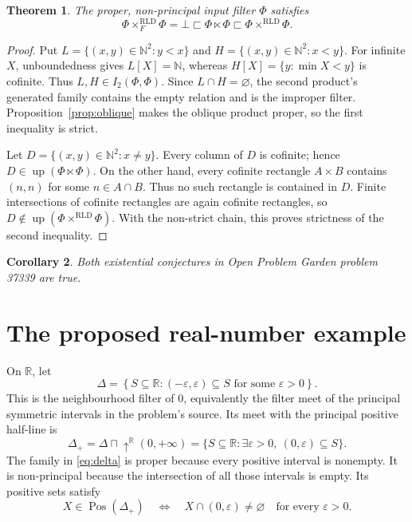 \documentclass[11pt,a4paper]{amsart}
\newtheorem{theorem}{Theorem}[section]
\newtheorem{corollary}[theorem]{Corollary}
\theoremstyle{definition}
\theoremstyle{remark}
\newcommand{\RLD}{\mathrm{RLD}}
\newcommand{\Up}{\operatorname{up}}
\newcommand{\Pos}{\operatorname{Pos}}
\newcommand{\N}{\mathbb{N}}
\newcommand{\R}{\mathbb{R}}
\begin{document}
\begin{theorem}\label{thm:nat}
The proper, non-principal input filter $\Phi$ satisfies
\[
 \Phi\times_F^{\RLD}\Phi=\bot
 \sqsubset\Phi\ltimes\Phi
 \sqsubset\Phi\times^{\RLD}\Phi.
\]
\end{theorem}
\begin{proof}
Put $L=\{(x,y)\in\N^2:y<x\}$ and $H=\{(x,y)\in\N^2:x<y\}$.
For infinite $X$, unboundedness gives $L[X]=\N$, whereas
$H[X]=\{y:\min X<y\}$ is cofinite. Thus $L,H\in I_2(\Phi,\Phi)$.
Since $L\cap H=\varnothing$, the second product's generated family contains
the empty relation and is the improper filter. Proposition~\ref{prop:oblique}
makes the oblique product proper, so the first inequality is strict.

Let $D=\{(x,y)\in\N^2:x\ne y\}$. Every column of $D$ is cofinite;
hence $D\in\Up(\Phi\ltimes\Phi)$. On the other hand, every cofinite
rectangle $A\times B$ contains $(n,n)$ for some $n\in A\cap B$.
Thus no such rectangle is contained in $D$. Finite intersections of cofinite
rectangles are again cofinite rectangles, so
$D\notin\Up(\Phi\times^{\RLD}\Phi)$. With the non-strict chain, this
proves strictness of the second inequality.
\end{proof}

\begin{corollary}
Both existential conjectures in Open Problem Garden problem 37339 are true.
\end{corollary}

\section{The proposed real-number example}

On $\R$, let
\[
 \Delta=\left\{S\subseteq\R:
       (-\varepsilon,\varepsilon)\subseteq S\text{ for some }\varepsilon>0
       \right\}.
\]
This is the neighbourhood filter of $0$, equivalently the filter meet of the
principal symmetric intervals in the problem's source. Its meet with the
principal positive half-line is
\begin{equation}\label{eq:delta}
 \Delta_+=\Delta\sqcap\uparrow^{\R}(0,+\infty)
 =\{S\subseteq\R:\exists\varepsilon>0,\ (0,\varepsilon)\subseteq S\}.
\end{equation}
The family in \eqref{eq:delta} is proper because every positive interval is
nonempty. It is non-principal because the intersection of all those intervals
is empty. Its positive sets satisfy
\begin{equation}\label{eq:positive-real}
 X\in\Pos(\Delta_+)
 \quad\Longleftrightarrow\quad
 X\cap(0,\varepsilon)\ne\varnothing\quad\text{for every }\varepsilon>0.
\end{equation}
\end{document}
